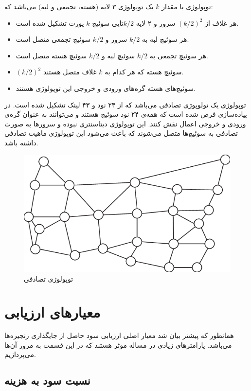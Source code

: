 توپولوژی  با مقدار \(k\) یک توپولوژی ۳ لایه (هسته، تجمعی و لبه) می‌باشد که:
\begin{itemize}
    \item هر غلاف از \((k/2)^2\) سرور و ۲ لایه \(k/2\)تایی سوئیچ \(k\) پورت تشکیل شده است.
    \item هر سوئیچ لبه به \(k/2\) سرور و \(k/2\) سوئیچ تجمعی متصل است.
    \item هر سوئیچ تجمعی به \(k/2\) سوئیچ لبه و \(k/2\) سوئیچ هسته متصل است.
    \item \((k/2)^2\) سوئیچ هسته که هر کدام به \(k\) غلاف متصل هستند.
    \item سوئیچ‌های هسته گره‌های ورودی و خروجی این توپولوژی هستند.
\end{itemize}

توپولوژی  یک تولوپوژی تصادفی می‌باشد که از ۲۴ نود و ۴۳ لینک تشکیل شده است.
در پیاده‌سازی فرض شده است که همه‌ی ۲۴ نود سوئیچ هستند و می‌توانند به عنوان گره‌ی ورودی و خروجی اعمال نقش کنند.
این توپولوژی دیتاسنتری نبوده و سرور‌ها به صورت تصادفی به سوئیچ‌ها متصل می‌شوند که باعث می‌شود
این توپولوژی ماهیت تصادفی داشته باشد.

\begin{figure}[!h]
\center\includegraphics[scale=.5]{images/usnet}
\caption{توپولوژی تصادفی }
\label{fig.3}
\end{figure}

\section{معیار‌های ارزیابی}

همانطور که پیشتر بیان شد معیار اصلی ارزیابی سود حاصل از جایگذاری زنجیره‌ها می‌باشد.
پارامترهای زیادی در مساله موثر هستند که در این قسمت به مرور آن‌ها می‌پردازیم.

\subsection{نسبت سود به هزینه}

